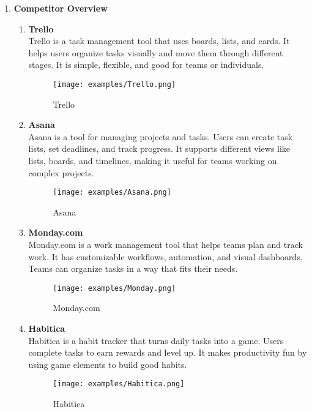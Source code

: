 \begin{enumerate}

    \item \textbf{Competitor Overview}
    \begin{enumerate}
        \item \textbf{Trello} \\
        Trello is a task management tool that uses boards, lists, and cards. It helps users organize tasks visually and move them through different stages. It is simple, flexible, and good for teams or individuals.  

        \begin{figure}[H]
            \centering
            \texttt{[image: examples/Trello.png]}
            \caption{Trello}
        \end{figure}

        \item \textbf{Asana} \\
        Asana is a tool for managing projects and tasks. Users can create task lists, set deadlines, and track progress. It supports different views like lists, boards, and timelines, making it useful for teams working on complex projects.  

        \begin{figure}[H]
            \centering
            \texttt{[image: examples/Asana.png]}
            \caption{Asana}
        \end{figure}

        \item \textbf{Monday.com} \\
        Monday.com is a work management tool that helps teams plan and track work. It has customizable workflows, automation, and visual dashboards. Teams can organize tasks in a way that fits their needs.  

        \begin{figure}[H]
            \centering
            \texttt{[image: examples/Monday.png]}
            \caption{Monday.com}
    \end{figure}

    \item \textbf{Habitica} \\
    Habitica is a habit tracker that turns daily tasks into a game. Users complete tasks to earn rewards and level up. It makes productivity fun by using game elements to build good habits.  

    \begin{figure}[H]
        \centering
        \texttt{[image: examples/Habitica.png]}
        \caption{Habitica}
    \end{figure}


\end{enumerate}
\end{enumerate}
